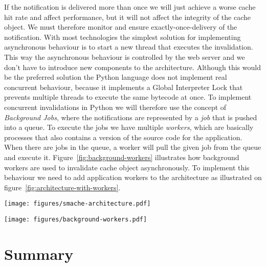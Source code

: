 If the notification is delivered more than once we will just achieve a worse cache hit rate and affect performance, but it will not affect the integrity of the cache object. We must therefore monitor and ensure exactly-once-delivery of the notification.
With most technologies the simplest solution for implementing asynchronous behaviour is to start a new thread that executes the invalidation. This way the asynchronous behaviour is controlled by the web server and we don't have to introduce new components to the architecture. Although this would be the preferred solution the Python language does not implement real concurrent behaviour, because it implements a Global Interpreter Lock that prevents multiple threads to execute the same bytecode at once.
To implement concurrent invalidations in Python we will therefore use the concept of \emph{Background Jobs}, where the notifications are represented by a \emph{job} that is pushed into a queue. To execute the jobs we have multiple \emph{workers}, which are basically processes that also contains a version of the source code for the application. When there are jobs in the queue, a worker will pull the given job from the queue and execute it. Figure~\ref{fig:background-workers} illustrates how background workers are used to invalidate cache object asynchronously. To implement this behaviour we need to add application workers to the architecture as illustrated on figure~\ref{fig:architecture-with-workers}.

\begin{figure*}[ht!]
  \centering
  \texttt{[image: figures/smache-architecture.pdf]}
  \caption{The architecture required by a web application that uses Smache with automatic invalidation.}
  \label{fig:architecture-with-workers}
\end{figure*}

\begin{figure*}[ht!]
  \centering
  \texttt{[image: figures/background-workers.pdf]}
  \caption{How background workers are used do perform invalidation asynchronously.}
  \label{fig:background-workers}
\end{figure*}



\section{Summary}
\label{sec:invalidation-summary}

